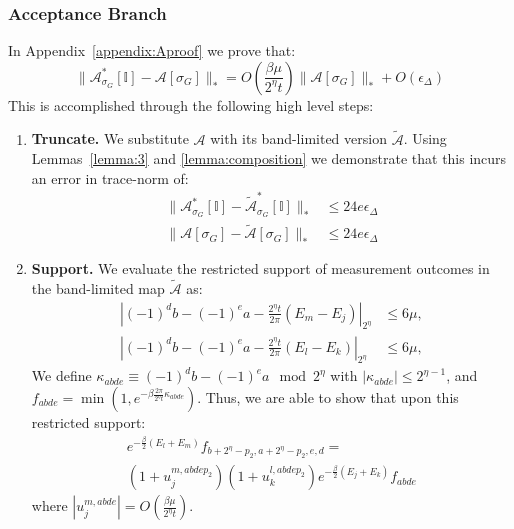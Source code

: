\documentclass[aps,floatfix,10pt,amssymb,amsfont,amsmath,superscriptaddress,float,nofootinbib,longbibliography,nobalancelastpage,twocolumn]{revtex4-2}
\begin{document}
\subsubsection{Acceptance Branch}
\label{section:accept}
In Appendix~\ref{appendix:Aproof} we prove that:
\begin{equation}
    \|\mathcal{A}^*_{\sigma_G}[\mathbb{I}] - \mathcal{A}[\sigma_G]\|_* = O\!\left(\frac{\beta\mu}{2^{\eta}t}\right)\|\mathcal{A}[\sigma_G]\|_* + O\!\left(\epsilon_{\Delta}\right)
    \label{eq:suma0}
\end{equation}
This is accomplished through the following high level steps:
\begin{enumerate}
    \item \textbf{Truncate.} We substitute $\mathcal{A}$ with its band-limited version $\tilde{\mathcal{A}}$. Using Lemmas~\ref{lemma:3} and \ref{lemma:composition} we demonstrate that this incurs an error in trace-norm of:
    \begin{equation}
    \begin{aligned}
    \|\mathcal{A}^*_{\sigma_G}[\mathbb{I}] - \tilde{\mathcal{A}}^*_{\sigma_G}[\mathbb{I}]\|_* &\leq 24e\epsilon_{\Delta}\\
    \|\mathcal{A}[\sigma_G] - \tilde{\mathcal{A}}[\sigma_G]\|_*  &\leq 24e\epsilon_{\Delta}
    \end{aligned}
    \label{eq:suma1}
\end{equation}
\item \textbf{Support.} We evaluate the restricted support of measurement outcomes in the band-limited map $\tilde{\mathcal{A}}$ as:
\begin{equation}
\begin{aligned}
    \left|(-1)^db -(-1)^ea-\frac{2^{\eta}t}{2\pi}(E_m-E_j)\right|_{2^{\eta}}&\leq 6\mu,\\
    \left|(-1)^db -(-1)^ea-\frac{2^{\eta}t}{2\pi}(E_l-E_k)\right|_{2^{\eta}}&\leq 6\mu,
\end{aligned}
\end{equation}
We define $\kappa_{abde} \equiv (-1)^db -(-1)^ea \mod 2^{\eta}$ with $|\kappa_{abde}| \leq 2^{\eta-1}$, and $f_{abde} =  \min(1,e^{-\beta\frac{2\pi}{2^{\eta}t}\kappa_{abde}})$. Thus, we are able to show that upon this restricted support:
\begin{multline}
e^{-\frac{\beta}{2}(E_l+E_m)}f_{b+2^{\eta}-p_2,a+2^{\eta}-p_2,e,d}
=\\(1+u_j^{m,abdep_2})(1+u_k^{l,abdep_2})e^{-\frac{\beta}{2}(E_j+E_k)}f_{abde}
\end{multline}
where $|u^{m,abde}_j| = O(\frac{\beta \mu}{2^{\eta}t})$.


\end{enumerate}
\end{document}
